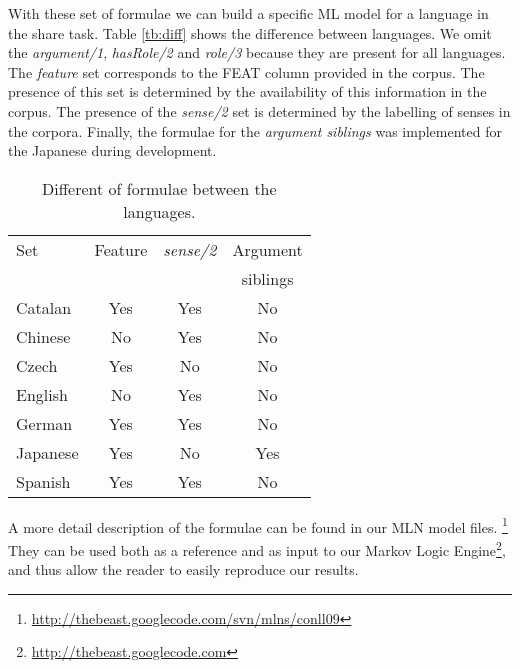 With these set of formulae we can build a specific ML model for a language in 
the share task. Table \ref{tb:diff} shows the difference between languages. We 
omit the \emph{argument/1}, \emph{hasRole/2} and \emph{role/3} because they 
are present for all languages. The \emph{feature} set corresponds to the FEAT 
column provided in the corpus.  The presence of this set is determined by the 
availability of this information in the corpus.  The presence of the 
\emph{sense/2} set is determined by the labelling of senses in the corpora.  
Finally, the formulae for the \emph{argument siblings} was implemented for the 
Japanese during development. 

\begin{table}
\begin{center}
\small
\begin{tabular}{|l|c|c|c|}\hline
    Set             & Feature   & \emph{sense/2}  & Argument \\
                &            &        & siblings  \\\hline\hline
Catalan         &   Yes      &  Yes   &  No  \\
Chinese         &   No       &  Yes   &  No  \\
Czech           &   Yes      &  No    &  No  \\
English         &   No       &  Yes   &  No  \\
German          &   Yes      &  Yes   &  No  \\
Japanese        &   Yes      &  No    &  Yes \\
Spanish         &   Yes      &  Yes   &  No  \\
\hline
\end{tabular}
\caption{Different of formulae between the languages.}
\label{tbl:diff}
\normalsize
\end{center}
\end{table}

A more detail description of the formulae can be found in our MLN model files.  
\footnote{\url{http://thebeast.googlecode.com/svn/mlns/conll09}} They can be 
used both as a reference and as input to our Markov Logic 
Engine\footnote{\url{http://thebeast.googlecode.com}}, and thus allow the reader 
to easily reproduce our results.


